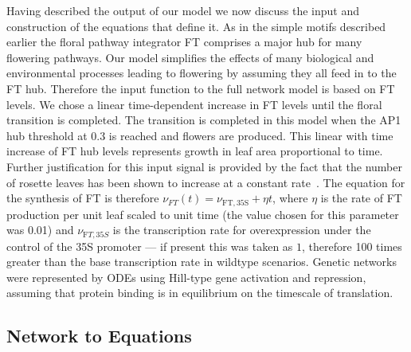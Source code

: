 Having described the output of our model we now discuss the input and construction of the equations that define it.
As in the simple motifs described earlier the floral pathway integrator FT comprises a major hub for many flowering pathways.
Our model simplifies the effects of many biological and environmental processes leading to flowering by assuming they all feed in to the FT hub.
Therefore the input function to the full network model is based on FT levels.
We chose a linear time-dependent increase in FT levels until the floral transition is completed.
The transition is completed in this model when the AP1 hub threshold at 0.3 is reached and flowers are produced.
This linear with time increase of FT hub levels represents growth in leaf area proportional to time.
Further justification for this input signal is provided by the fact that the number of rosette leaves has been shown to increase at a constant rate~\cite{pouteau2009}.
The equation for the synthesis of FT is therefore $\nu_{FT}(t) = \nu_{\mathrm{FT, 35S}} + {\eta} t$, where $\eta$ is the rate of FT production per unit leaf scaled to unit time (the value chosen for this parameter was 0.01) and $\nu_{\mathrm FT, 35S}$  is the transcription rate for overexpression under the control of the 35S promoter --- if present this was taken as $1$, therefore 100 times greater than the base transcription rate in wildtype scenarios.
Genetic networks were represented by ODEs using Hill-type gene activation and repression, assuming that protein binding is in equilibrium on the timescale of translation.

\subsection{Network to Equations}


